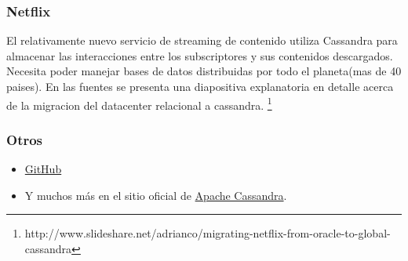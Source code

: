 \documentclass[11pt,a4paper]{article}
\begin{document}
\subsubsection{Netflix}
El relativamente nuevo servicio de streaming de contenido utiliza Cassandra para almacenar las interacciones entre los subscriptores y sus contenidos descargados. Necesita poder manejar bases de datos distribuidas por todo el planeta(mas de 40 paises). En las fuentes se presenta una diapositiva explanatoria en detalle acerca de la migracion del datacenter relacional a cassandra.
\footnote{http://www.slideshare.net/adrianco/migrating-netflix-from-oracle-to-global-cassandra}

\subsubsection{Otros}

\begin{itemize}
	\item \href{http://live-pc-development.pantheon.io/blog/analytics-at-github-with-apache-cassandra/}{GitHub}
	\item Y muchos más en el sitio oficial de \href{http://cassandra.apache.org/}{Apache Cassandra}.
\end{itemize}
\end{document}
